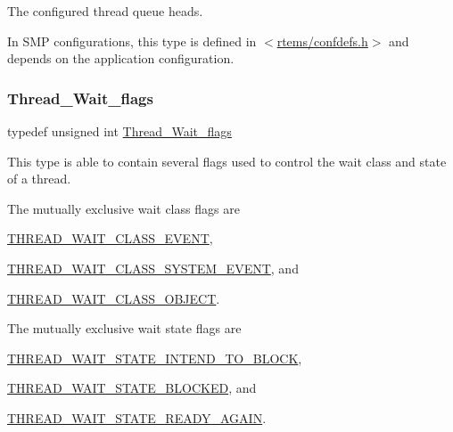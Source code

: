 The configured thread queue heads. 

In S\+MP configurations, this type is defined in $<$\mbox{\hyperlink{confdefs_8h}{rtems/confdefs.\+h}}$>$ and depends on the application configuration. \mbox{\label{group__RTEMSScoreThread_ga9a047ae9c77bc90a258203d4f2cc57db}} 
\subsubsection{\texorpdfstring{Thread\_Wait\_flags}{Thread\_Wait\_flags}}
{\footnotesize\ttfamily typedef unsigned int \mbox{\hyperlink{group__RTEMSScoreThread_ga9a047ae9c77bc90a258203d4f2cc57db}{Thread\+\_\+\+Wait\+\_\+flags}}}



This type is able to contain several flags used to control the wait class and state of a thread. 

The mutually exclusive wait class flags are
\begin{DoxyItemize}
\item \mbox{\hyperlink{group__RTEMSScoreThread_gaefe28b0cc1c352513a17974207cf9f4b}{T\+H\+R\+E\+A\+D\+\_\+\+W\+A\+I\+T\+\_\+\+C\+L\+A\+S\+S\+\_\+\+E\+V\+E\+NT}},
\item \mbox{\hyperlink{group__RTEMSScoreThread_gad87c9c823f1022eb0843801438b91f29}{T\+H\+R\+E\+A\+D\+\_\+\+W\+A\+I\+T\+\_\+\+C\+L\+A\+S\+S\+\_\+\+S\+Y\+S\+T\+E\+M\+\_\+\+E\+V\+E\+NT}}, and
\item \mbox{\hyperlink{group__RTEMSScoreThread_ga8ad326b1eb2ad7ab1c74a69052aac37c}{T\+H\+R\+E\+A\+D\+\_\+\+W\+A\+I\+T\+\_\+\+C\+L\+A\+S\+S\+\_\+\+O\+B\+J\+E\+CT}}.
\end{DoxyItemize}

The mutually exclusive wait state flags are
\begin{DoxyItemize}
\item \mbox{\hyperlink{group__RTEMSScoreThread_ga82059fe7353c5129db4c812b7c82f6bf}{T\+H\+R\+E\+A\+D\+\_\+\+W\+A\+I\+T\+\_\+\+S\+T\+A\+T\+E\+\_\+\+I\+N\+T\+E\+N\+D\+\_\+\+T\+O\+\_\+\+B\+L\+O\+CK}},
\item \mbox{\hyperlink{group__RTEMSScoreThread_gaa9487eb8db998d29cb1f712155769583}{T\+H\+R\+E\+A\+D\+\_\+\+W\+A\+I\+T\+\_\+\+S\+T\+A\+T\+E\+\_\+\+B\+L\+O\+C\+K\+ED}}, and
\item \mbox{\hyperlink{group__RTEMSScoreThread_gac00cb9ccdda63a4731f4d80a89371ea0}{T\+H\+R\+E\+A\+D\+\_\+\+W\+A\+I\+T\+\_\+\+S\+T\+A\+T\+E\+\_\+\+R\+E\+A\+D\+Y\+\_\+\+A\+G\+A\+IN}}. 
\end{DoxyItemize}

